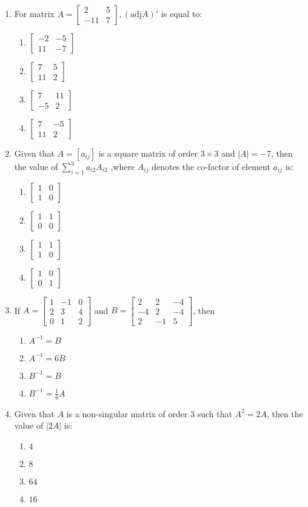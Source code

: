 \documentclass{article}
\newcommand{\myvec}[1]{\begin{bmatrix}#1\end{bmatrix}}
\begin{document}
\begin{enumerate}
    \item For matrix $A = \myvec{2 & 5 \\ -11 & 7}, (\text{adj}A)'$ is equal to:
    \begin{enumerate}
        \item $\myvec{-2 & -5 \\ 11 & -7}$
        \item $\myvec{7 & 5 \\ 11 & 2}$
        \item $\myvec{7 & 11 \\ -5 & 2}$
        \item $\myvec{7 & -5 \\ 11 & 2}$
    \end{enumerate}

    \item Given that $A = [a_{ij}]$ is a square matrix of order $3 \times 3$ and $|A| = -7$, then the value of  $\sum_{i=1}^{3} a_{i2}A_{i2}$ ,where $A_{ij}$ denotes the co-factor of element $a_{ij}$ is:

    \begin{enumerate}
        \item $\myvec{1 & 0 \\ 1 & 0}$
        \item $ \myvec{1 & 1 \\ 0 & 0}$
        \item $\myvec{1 & 1 \\ 1 & 0}$
        \item $\myvec{1 & 0 \\ 0 & 1}$
    \end{enumerate}

    
    \item If $A =\myvec{1 &-1 & 0 \\2&3 & 4 \\0&1&2}$ and $B = \myvec{2&2&-4\\-4&2&-4\\2&-1&5}$, then
    \begin{enumerate}
        \item $A^{-1} = B$
        \item $A^{-1} = 6B$
        \item $B^{-1} = B$
        \item $B^{-1} = \frac{1}{6} A$
    \end{enumerate}
    \item Given that $A$ is a non-singular matrix of order $3$ such that $A^2 = 2A$, then the value of $|2A|$ is:
    \begin{enumerate}
        \item $4$
        \item $8$
        \item $64$
        \item $16$
    \end{enumerate}
    

\end{enumerate}
\end{document}
